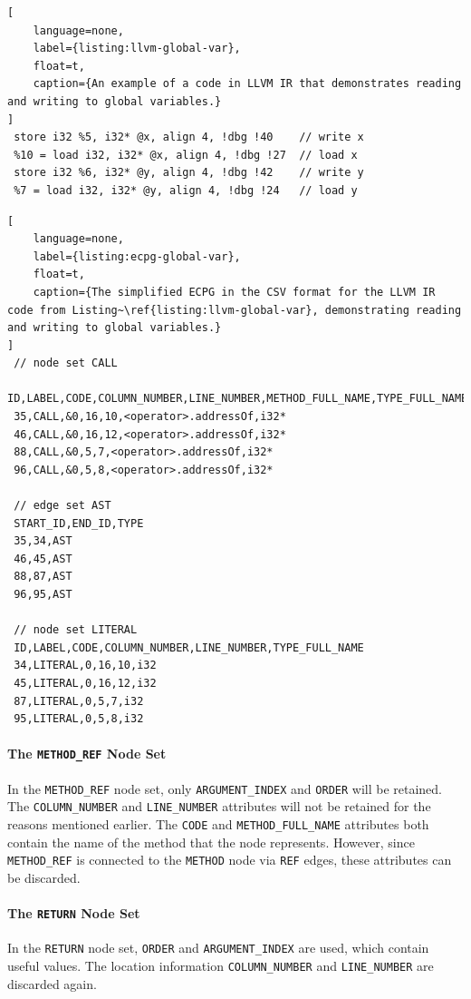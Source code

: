 \begin{lstlisting}[
    language=none, 
    label={listing:llvm-global-var}, 
    float=t,
    caption={An example of a code in LLVM IR that demonstrates reading and writing to global variables.}
]
 store i32 %5, i32* @x, align 4, !dbg !40    // write x
 %10 = load i32, i32* @x, align 4, !dbg !27  // load x
 store i32 %6, i32* @y, align 4, !dbg !42    // write y
 %7 = load i32, i32* @y, align 4, !dbg !24   // load y 
\end{lstlisting}

\begin{lstlisting}[
    language=none, 
    label={listing:ecpg-global-var}, 
    float=t,
    caption={The simplified ECPG in the CSV format for the LLVM IR code from Listing~\ref{listing:llvm-global-var}, demonstrating reading and writing to global variables.}
]
 // node set CALL
 ID,LABEL,CODE,COLUMN_NUMBER,LINE_NUMBER,METHOD_FULL_NAME,TYPE_FULL_NAME
 35,CALL,&0,16,10,<operator>.addressOf,i32*
 46,CALL,&0,16,12,<operator>.addressOf,i32*
 88,CALL,&0,5,7,<operator>.addressOf,i32*
 96,CALL,&0,5,8,<operator>.addressOf,i32*
 
 // edge set AST
 START_ID,END_ID,TYPE
 35,34,AST
 46,45,AST
 88,87,AST
 96,95,AST
 
 // node set LITERAL
 ID,LABEL,CODE,COLUMN_NUMBER,LINE_NUMBER,TYPE_FULL_NAME
 34,LITERAL,0,16,10,i32
 45,LITERAL,0,16,12,i32
 87,LITERAL,0,5,7,i32
 95,LITERAL,0,5,8,i32
\end{lstlisting}

\paragraph{The \texttt{METHOD\_REF} Node Set}
In the \texttt{METHOD\_REF} node set, only \texttt{ARGUMENT\_INDEX} and \texttt{ORDER} will be retained. The \texttt{COLUMN\_NUMBER} and \texttt{LINE\_NUMBER} attributes will not be retained for the reasons mentioned earlier. The \texttt{CODE} and \texttt{METHOD\_FULL\_NAME} attributes both contain the name of the method that the node represents. However, since \texttt{METHOD\_REF} is connected to the \texttt{METHOD} node via \texttt{REF} edges, these attributes can be discarded.

\paragraph{The \texttt{RETURN} Node Set}
In the \texttt{RETURN} node set, \texttt{ORDER} and \texttt{ARGUMENT\_INDEX} are used, which contain useful values. The location information \texttt{COLUMN\_NUMBER} and \texttt{LINE\_NUMBER} are discarded again.

